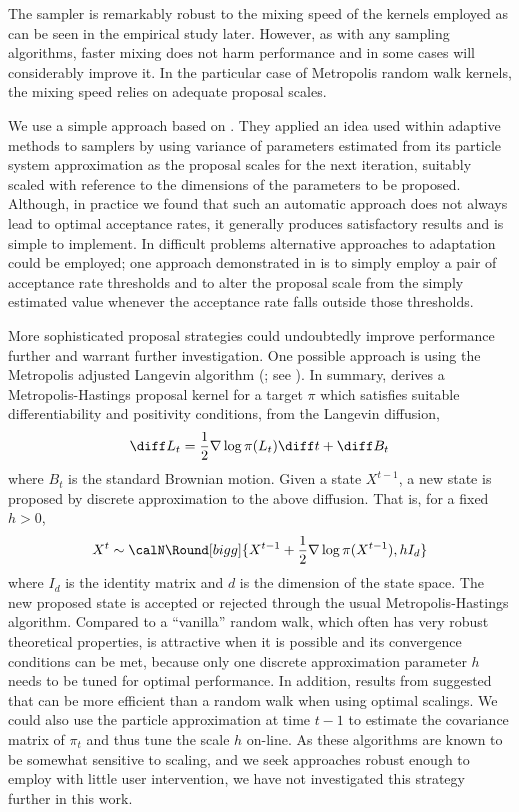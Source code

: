 The \smc sampler is remarkably robust to the mixing speed of the \mcmc kernels employed as can be seen in the empirical study later. However, as with any sampling algorithms, faster mixing does not harm performance and in some cases will considerably improve it. In the particular case of Metropolis random walk kernels, the mixing speed relies on adequate proposal scales.

We use a simple approach based on \cite{Jasra:2010eh}. They applied an idea used within adaptive \mcmc methods \cite{Andrieu:2006tw} to \smc samplers by using variance of parameters estimated from its particle system approximation as the proposal scales for the next iteration, suitably scaled with reference to the dimensions of the parameters to be proposed. Although, in practice we found that such an automatic approach does not always lead to optimal acceptance rates, it generally produces satisfactory results and is simple to implement. In difficult problems alternative approaches to adaptation could be employed; one approach demonstrated in \cite{Jasra:2010eh} is to simply employ a pair of acceptance rate thresholds and to alter the proposal scale from the simply estimated value whenever the acceptance rate falls outside those thresholds.

More sophisticated proposal strategies could undoubtedly improve performance further and warrant further investigation. One possible approach is using the Metropolis adjusted Langevin algorithm (\mala; see \cite{Roberts:1996vd}). In summary, \mala derives a Metropolis-Hastings proposal kernel for a target $\pi$ which satisfies suitable differentiability and positivity conditions, from the Langevin diffusion,
\begin{equation*}
  \diff L_t = \frac{1}{2}\nabla\log\pi(L_t)\diff t + \diff B_t
\end{equation*}
where $B_t$ is the standard Brownian motion. Given a state $X^{t-1}$, a new state is proposed by discrete approximation to the above diffusion. That is, for a fixed $h > 0$,
\begin{equation}
  X^t\sim\calN\Round[bigg]{X^{t-1}+\frac{1}{2}\nabla\log\pi(X^{t-1}), hI_d}
\end{equation}
where $I_d$ is the identity matrix and $d$ is the dimension of the state space. The new proposed state is accepted or rejected through the usual Metropolis-Hastings algorithm. Compared to a ``vanilla'' random walk, which often has very robust theoretical properties, \mala is attractive when it is possible and its convergence conditions \cite{Roberts:1996vd} can be met, because only one discrete approximation parameter $h$ needs to be tuned for optimal performance. In addition, results from \cite{Roberts:2001ta} suggested that \mala can be more efficient than a random walk when using optimal scalings. We could also use the particle approximation at time $t - 1$ to estimate the covariance matrix of $\pi_t$ and thus tune the scale $h$ on-line. As these algorithms are known to be somewhat sensitive to scaling, and we seek approaches robust enough to employ with little user intervention, we have not investigated this strategy further in this work.

